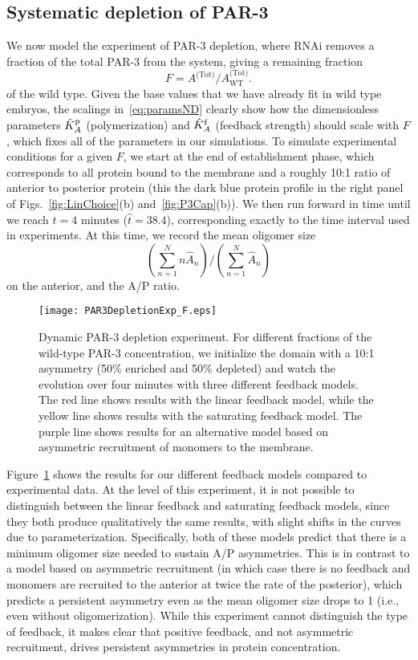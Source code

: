\documentclass[11pt]{article}
\newcommand{\6}[1]{#1_{\text{6}}}
\newcommand{\3}[1]{#1_{\text{3}}}
\newcommand{\Tot}[1]{#1^\text{(Tot)}}
\begin{document}
\subsection{Systematic depletion of PAR-3 \label{sec:howFB}}
We now model the experiment of PAR-3 depletion, where RNAi removes a fraction of the total PAR-3 from the system, giving a remaining fraction
\begin{equation*}
F=\Tot{A}/\Tot{A}_\text{WT}.
\end{equation*}
of the wild type. Given the base values that we have already fit in wild type embryos, the scalings in\ \eqref{eq:paramsND} clearly show how the dimensionless parameters $\hat{K}^\text{p}_A$ (polymerization) and $\hat{K}^\text{f}_A$ (feedback strength) should scale with $F$, which fixes all of the parameters in our simulations. To simulate experimental conditions for a given $F$, we start at the end of establishment phase, which corresponds to all protein bound to the membrane and a roughly 10:1 ratio of anterior to posterior protein (this the dark blue protein profile in the right panel of Figs.\ \ref{fig:LinChoice}(b) and\ \ref{fig:P3Cap}(b)). We then run forward in time until we reach $t=4$ minutes ($\hat t = 38.4$), corresponding exactly to the time interval used in experiments. At this time, we record the mean oligomer size $$\displaystyle{\left(\sum_{n=1}^N n \hat A_n\right)}/{\displaystyle{\left(\sum_{n=1}^N \hat A_n\right)}}$$
on the anterior, and the A/P ratio. 

\begin{figure}
\centering
\texttt{[image: PAR3DepletionExp\_F.eps]}
\caption{\label{fig:P3DeplF}Dynamic PAR-3 depletion experiment. For different fractions of the wild-type PAR-3 concentration, we initialize the domain with a 10:1 asymmetry (50\% enriched and 50\% depleted) and watch the evolution over four minutes with three different feedback models. The red line shows results with the linear feedback model, while the yellow line shows results with the saturating feedback model. The purple line shows results for an alternative model based on asymmetric recruitment of monomers to the membrane.}
\end{figure}

Figure\ \ref{fig:P3DeplF} shows the results for our different feedback models compared to experimental data. At the level of this experiment, it is not possible to distinguish between the linear feedback and saturating feedback models, since they both produce qualitatively the same results, with slight shifts in the curves due to parameterization. Specifically, both of these models predict that there is a minimum oligomer size needed to sustain A/P asymmetries. This is in contrast to a model based on asymmetric recruitment (in which case there is no feedback and monomers are recruited to the anterior at twice the rate of the posterior), which predicts a persistent asymmetry even as the mean oligomer size drops to 1 (i.e., even without oligomerization). While this experiment cannot distinguish the type of feedback, it makes clear that positive feedback, and not asymmetric recruitment, drives persistent asymmetries in protein concentration.
\end{document}
